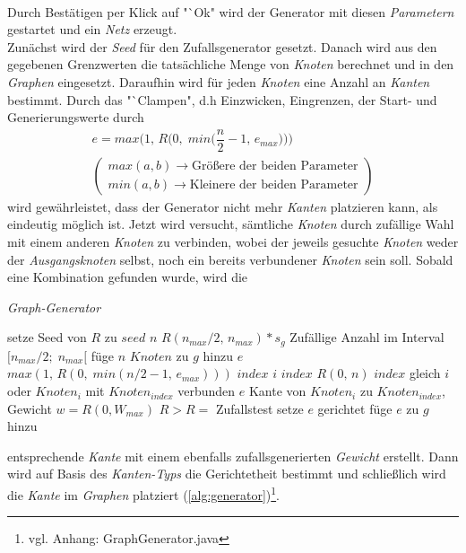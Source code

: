 \documentclass[12pt]{article}
\begin{document}
\\
Durch Bestätigen per Klick auf "`Ok" wird der Generator mit diesen \textit{Parametern} gestartet und ein \textit{Netz} erzeugt.
\\
Zunächst wird der \textit{Seed} für den Zufallsgenerator gesetzt. Danach wird aus den gegebenen Grenzwerten die tatsächliche Menge von \textit{Knoten} berechnet und in den \textit{Graphen} eingesetzt. Daraufhin wird für jeden \textit{Knoten} eine Anzahl an \textit{Kanten} bestimmt. Durch das "`Clampen", d.h Einzwicken, Eingrenzen, der Start- und Generierungswerte durch
\vspace{-20pt}
\begin{gather*}
e = max\Big(1,\,R\Big(0,\;min\Big(\dfrac{n}{2}-1,\,e_{max}\Big)\Big)\Big) \\
\left(\begin{aligned}
max(a, b) \to \text{Größere der beiden Parameter}\\
min(a, b) \to \text{Kleinere der beiden Parameter}
\end{aligned}
\right)
\end{gather*}
wird gewährleistet, dass der Generator nicht mehr \textit{Kanten} platzieren kann, als eindeutig möglich ist. Jetzt wird versucht, sämtliche \textit{Knoten} durch zufällige Wahl mit einem anderen \textit{Knoten} zu verbinden, wobei der jeweils gesuchte \textit{Knoten} weder der \textit{Ausgangsknoten} selbst, noch ein bereits verbundener \textit{Knoten} sein soll. Sobald eine Kombination gefunden wurde, wird die 
\begin{algorithm}
\caption{\textit{Graph-Generator} \label{alg:generator}}
\begin{algorithmic}[1]
\Statex
{}
\Statex
{}
	\State setze Seed von $R$ zu $seed$
	\State \sei $n$ $R(n_{max}/2,\,n_{max}) * s_g$ \Comment Zufällige Anzahl im Interval $\big[n_{max}/2;\;n_{max}\big[$
	\State füge $n$ $Knoten$ zu $g$ hinzu
		\State \sei $e$ $max(1,\,R(0,\;min(n/2-1,\,e_{max})))$
			\State \sei $index$ $i$
			\Repeat 
			\State \sei $index$ $R(0,\,n)$
			\Until $index$ gleich $i$ oder $Knoten_i$ mit $Knoten_{index}$ verbunden
			\State \sei $e$ Kante von $Knoten_i$ zu $Knoten_{index}$, Gewicht $w = R(0, W_{max})$
			 \State \Comment $R>R =$ Zufallstest
				\State setze $e$ gerichtet
			\EndIf
			\State füge $e$ zu $g$ hinzu
		\EndFor
	\EndFor
\EndProcedure
\end{algorithmic}
\end{algorithm}
entsprechende \textit{Kante} mit einem ebenfalls zufallsgenerierten \textit{Gewicht} erstellt. 
Dann wird auf Basis des \textit{Kanten-Typs} die Gerichtetheit bestimmt und schließlich wird die \textit{Kante} im \textit{Graphen} platziert (\autoref{alg:generator})\footnote{vgl. Anhang: GraphGenerator.java}.
\end{document}
